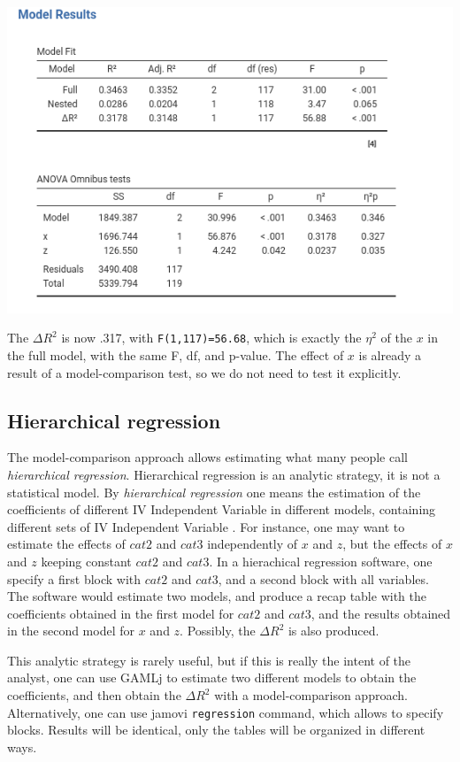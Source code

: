 \documentclass[
]{book}
\begin{document}
\includegraphics[width=7.92in]{bookletpics/2_modelcomparison_output6}

The \(\Delta R^2\) is now .317, with \texttt{F(1,117)=56.68}, which is exactly the \(\eta^2\) of the \(x\) in the full model, with the same F, df, and p-value. The effect of \(x\) is already a result of a model-comparison test, so we do not need to test it explicitly.

\hypertarget{hierarchical-regression}{%
\subsection{Hierarchical regression}\label{hierarchical-regression}}

The model-comparison approach allows estimating what many people call \emph{hierarchical regression}. Hierarchical regression is an analytic strategy, it is not a statistical model. By \emph{hierarchical regression} one means the estimation of the coefficients of different {IV {Independent Variable} } in different models, containing different sets of {IV {Independent Variable} }. For instance, one may want to estimate the effects of \(cat2\) and \(cat3\) independently of \(x\) and \(z\), but the effects of \(x\) and \(z\) keeping constant \(cat2\) and \(cat3\). In a hierachical regression software, one specify a first block with \(cat2\) and \(cat3\), and a second block with all variables. The software would estimate two models, and produce a recap table with the coefficients obtained in the first model for \(cat2\) and \(cat3\), and the results obtained in the second model for \(x\) and \(z\). Possibly, the \(\Delta R^2\) is also produced.

This analytic strategy is rarely useful, but if this is really the intent of the analyst, one can use {GAMLj} to estimate two different models to obtain the coefficients, and then obtain the \(\Delta R^2\) with a model-comparison approach. Alternatively, one can use {jamovi} \texttt{regression} command, which allows to specify blocks. Results will be identical, only the tables will be organized in different ways.
\end{document}
